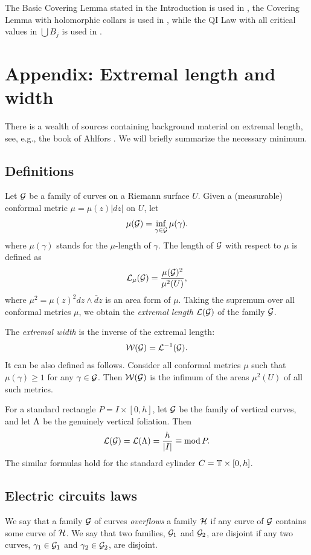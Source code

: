 The Basic Covering Lemma stated in the Introduction is used in \cite{high},
the Covering Lemma with holomorphic collars  is used in \cite{decorations}, while
the QI Law with all critical values in $\bigcup B_j$  is used in  \cite{K}.

\section{Appendix: Extremal length and width}

There is a wealth of sources containing background material on extremal length,
see, e.g., the book of Ahlfors \cite{A}. 
We will briefly summarize the necessary minimum. 

\subsection{Definitions}
Let ${\cal G}$ be a family of curves on a Riemann surface $U$.
Given a (measurable) conformal metric $\mu= \mu(z) |dz|$ on $U$, 
let
$$   \mu ({\cal G}) = \inf_{\gamma\in {\cal G}}  \mu (\gamma).$$
 where $\mu(\gamma) $ stands for the $\mu$-length of $\gamma$.
The length of ${\cal G}$  with respect to $\mu$ is defined as   
$$
   {\cal L}_\mu ({\cal G}) = \frac {\mu({\cal G})^2 } {\mu^2 (U)}, 
$$
where $\mu^2= \mu(z)^2 dz\wedge \bar dz$ is an area form of $\mu$.
Taking the supremum over all conformal metrics $\mu$, we obtain the {\it extremal length}
${\cal L}({\cal G})$ of the family ${\cal G}$. 

  The {\it extremal width} is the inverse of the extremal length:
$$
 {\cal W}({\cal G})={\cal L}^{-1}({\cal G}).
$$
It can be also defined as follows. Consider all conformal  metrics $\mu$ such that
$\mu(\gamma)\geq 1$ for any $\gamma\in {\cal G}$.  Then ${\cal W}({\cal G})$ is the infimum of 
the areas $\mu^2(U)$ of  all such metrics.

\begin{example}\label{extremal foliation}
    For a standard rectangle $P=I\times [0,h]$, let ${\cal G}$ be the family of vertical curves,
and let ${\Lambda}$ be the genuinely vertical foliation.
Then 
$$ 
    {\cal L}({\cal G})= {\cal L}({\Lambda}) = \frac{h}{|I|} \equiv \operatorname{mod} P.
$$
The similar formulas hold for the standard cylinder $C = {\Bbb T}\times [0,h]$.  
\end{example}
   


\subsection{Electric circuits laws} 
We say that a family  ${\cal G}$ of curves {\it overflows} a family ${\cal H}$ if
any curve of ${\cal G}$ contains some curve of ${\cal H}$.
We say that two families, ${\cal G}_1$ and ${\cal G}_2$, are disjoint if
any  two curves, $\gamma_1\in {\cal G}_1$ and $\gamma_2\in {\cal G}_2$, are disjoint.

